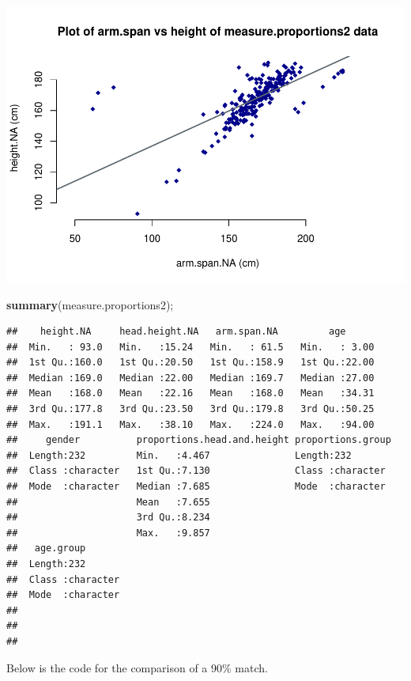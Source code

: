 \documentclass[]{article}
\newenvironment{Shaded}{\begin{snugshade}}{\end{snugshade}}
\newcommand{\KeywordTok}[1]{\textcolor[rgb]{0.13,0.29,0.53}{\textbf{#1}}}
\newcommand{\NormalTok}[1]{#1}
\begin{document}
\includegraphics{project-measure-writeup_files/figure-latex/appendix-proportions-arm-span-1.pdf}

\begin{Shaded}
\begin{Highlighting}[]
\KeywordTok{summary}\NormalTok{(measure.proportions2);}
\end{Highlighting}
\end{Shaded}

\begin{verbatim}
##    height.NA     head.height.NA   arm.span.NA         age       
##  Min.   : 93.0   Min.   :15.24   Min.   : 61.5   Min.   : 3.00  
##  1st Qu.:160.0   1st Qu.:20.50   1st Qu.:158.9   1st Qu.:22.00  
##  Median :169.0   Median :22.00   Median :169.7   Median :27.00  
##  Mean   :168.0   Mean   :22.16   Mean   :168.0   Mean   :34.31  
##  3rd Qu.:177.8   3rd Qu.:23.50   3rd Qu.:179.8   3rd Qu.:50.25  
##  Max.   :191.1   Max.   :38.10   Max.   :224.0   Max.   :94.00  
##     gender          proportions.head.and.height proportions.group 
##  Length:232         Min.   :4.467               Length:232        
##  Class :character   1st Qu.:7.130               Class :character  
##  Mode  :character   Median :7.685               Mode  :character  
##                     Mean   :7.655                                 
##                     3rd Qu.:8.234                                 
##                     Max.   :9.857                                 
##   age.group        
##  Length:232        
##  Class :character  
##  Mode  :character  
##                    
##                    
## 
\end{verbatim}

Below is the code for the comparison of a 90\% match.
\end{document}
